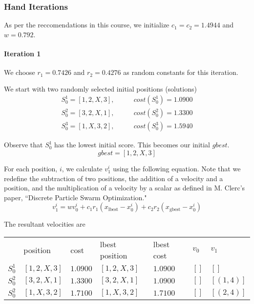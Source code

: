 \documentclass[a4paper]{article}
\newcommand{\subsubsubsection}[1]{\paragraph{#1} \mbox{}}
\begin{document}
\subsubsection{Hand Iterations}

As per the reccomendations in this course, we initialize $c_1 = c_2 = 1.4944$ and $w = 0.792$.

\subsubsubsection{Iteration 1}

We choose $r_1 = 0.7426$ and $r_2 = 0.4276$ as random constants for this iteration.

We start with two randomly selected initial positions (solutions)
\begin{align*}
S_0^1 = [1, 2, X, 3], & \qquad cost(S_0^1) = 1.0900 \\
S_0^2 = [3, 2, X, 1], & \qquad cost(S_0^2) = 1.3300 \\
S_0^3 = [1, X, 3, 2], & \qquad cost(S_0^3) = 1.5940
\end{align*}

Observe that $S_0^1$ has the lowest initial score. This becomes our initial $\mathit{gbest}$.
$$\mathit{gbest} = [1, 2, X, 3]$$

For each position, $i$, we calculate $v_1^i$ using the following equation. Note that we redefine the subtraction of two positions, the addition of a velocity and a position, and the multiplication of a velocity by a scalar as defined in M. Clerc's paper, ``Discrete Particle Swarm Optimization."
$$v_1^i = w v_0^i + c_1 r_1 (x_\text{lbest} - x_0^i) + c_2 r_2 (x_\text{gbest} - x_0^i)$$

The resultant velocities are \mbox{}
\begin{center}
\begin{tabular}{lllllll}
        & position     & cost   & lbest position & lbest cost & $v_0$  & $v_1$    \\
$S_0^1$ & $[1, 2, X, 3]$ & $1.0900$ & $[1, 2, X, 3]$   & $1.0900$     & $[]$     & $[]      $ \\
$S_0^2$ & $[3, 2, X, 1]$ & $1.3300$ & $[3, 2, X, 1]$   & $1.0900$     & $[]$     & $[(1, 4)]$ \\
$S_0^2$ & $[1, X, 3, 2]$ & $1.7100$ & $[1, X, 3, 2]$   & $1.7100$     & $[]$     & $[(2, 4)]$ \\
\end{tabular}
\end{center}
\end{document}
